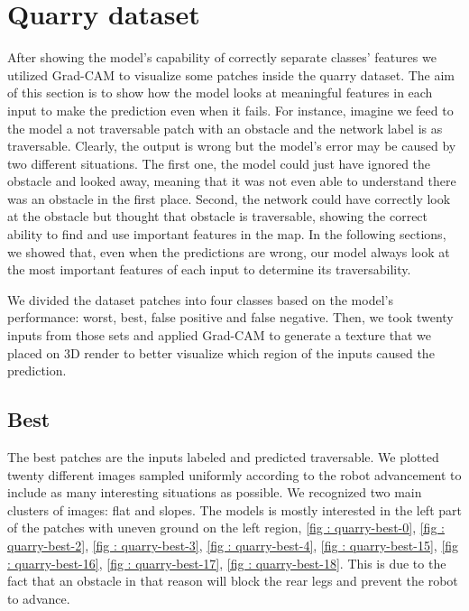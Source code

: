 % 
\section{Quarry dataset}
\label{sec: quarry-dataset}
After showing the model's capability of correctly separate classes' features we utilized Grad-CAM to visualize some patches inside the quarry dataset. The aim of this section is to show how the model looks at meaningful features in each input to make the prediction even when it fails. For instance, imagine we feed to the model a not traversable patch with an obstacle and the network label is as traversable. Clearly, the output is wrong but the model's error may be caused by two different situations. The first one, the model could just have ignored the obstacle and looked away, meaning that it was not even able to understand there was an obstacle in the first place. Second, the network could have correctly look at the obstacle but thought that obstacle is traversable, showing the correct ability to find and use important features in the map. In the following sections, we showed that, even when the predictions are wrong, our model always look at the most important features of each input to determine its traversability. 

We divided the dataset patches into four classes based on the model's performance: worst, best, false positive and false negative. Then, we took twenty inputs from those sets and applied Grad-CAM to generate a  texture that we placed on 3D render to better visualize which region of the inputs caused the prediction. 


\subsection{Best}
The best patches are the inputs labeled and predicted traversable. We plotted twenty different images sampled uniformly according to the robot advancement to include as many interesting situations as possible. We recognized two main clusters of images: flat and slopes. The models is mostly interested in the left part of the patches with uneven ground on the left region, \ref{fig : quarry-best-0}, \ref{fig : quarry-best-2}, \ref{fig : quarry-best-3}, \ref{fig : quarry-best-4}, \ref{fig : quarry-best-15}, \ref{fig : quarry-best-16}, \ref{fig : quarry-best-17}, \ref{fig : quarry-best-18}.  This is due to the fact that an obstacle in that reason will block the rear legs and prevent the robot to advance. 

